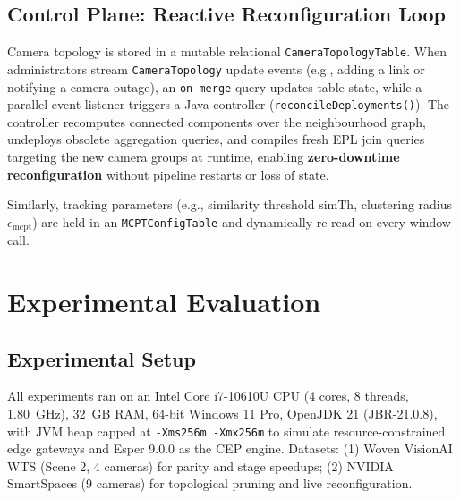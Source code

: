 \documentclass[conference]{IEEEtran}
\begin{document}
\subsection{Control Plane: Reactive Reconfiguration Loop}
Camera topology is stored in a mutable relational \texttt{CameraTopologyTable}. When administrators stream \texttt{CameraTopology} update events (e.g., adding a link or notifying a camera outage), an \texttt{on-merge} query updates table state, while a parallel event listener triggers a Java controller (\texttt{reconcileDeployments()}). The controller recomputes connected components over the neighbourhood graph, undeploys obsolete aggregation queries, and compiles fresh EPL join queries targeting the new camera groups at runtime, enabling \textbf{zero-downtime reconfiguration} without pipeline restarts or loss of state.

Similarly, tracking parameters (e.g., similarity threshold $\text{simTh}$, clustering radius $\epsilon_{\text{mcpt}}$) are held in an \texttt{MCPTConfigTable} and dynamically re-read on every window call.

\section{Experimental Evaluation}
\label{sec:evaluation}

\subsection{Experimental Setup}
All experiments ran on an Intel Core i7-10610U CPU (4 cores, 8 threads, 1.80~GHz), 32~GB RAM, 64-bit Windows 11 Pro, OpenJDK 21 (JBR-21.0.8), with JVM heap capped at \texttt{-Xms256m -Xmx256m} to simulate resource-constrained edge gateways and Esper 9.0.0 as the CEP engine. Datasets: (1) Woven VisionAI WTS (Scene 2, 4 cameras) for parity and stage speedups; (2) NVIDIA SmartSpaces (9 cameras) for topological pruning and live reconfiguration.
\end{document}

